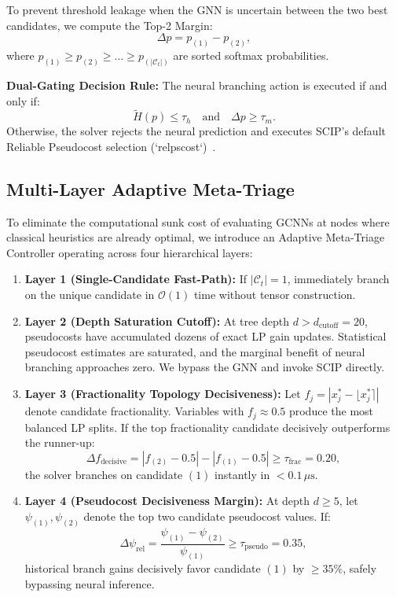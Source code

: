 \documentclass[10pt,twocolumn,letterpaper]{article}
\theoremstyle{plain}
\theoremstyle{definition}
\theoremstyle{remark}
\begin{document}
To prevent threshold leakage when the GNN is uncertain between the two best candidates, we compute the Top-2 Margin:
\begin{equation}
    \Delta p = p_{(1)} - p_{(2)}, \label{eq:margin}
\end{equation}
where $p_{(1)} \ge p_{(2)} \ge \dots \ge p_{(|\mathcal{C}_t|)}$ are sorted softmax probabilities.

\textbf{Dual-Gating Decision Rule:} The neural branching action is executed if and only if:
\begin{equation}
    \tilde{H}(p) \le \tau_h \quad \text{and} \quad \Delta p \ge \tau_m. \label{eq:dual_gate}
\end{equation}
Otherwise, the solver rejects the neural prediction and executes SCIP's default Reliable Pseudocost selection (`relpscost`)~\cite{achterberg2005branching}.

\subsection{Multi-Layer Adaptive Meta-Triage}
To eliminate the computational sunk cost of evaluating GCNNs at nodes where classical heuristics are already optimal, we introduce an Adaptive Meta-Triage Controller operating across four hierarchical layers:

\begin{enumerate}
    \item \textbf{Layer 1 (Single-Candidate Fast-Path):} If $|\mathcal{C}_t| = 1$, immediately branch on the unique candidate in $\mathcal{O}(1)$ time without tensor construction.
    \item \textbf{Layer 2 (Depth Saturation Cutoff):} At tree depth $d > d_{\text{cutoff}} = 20$, pseudocosts have accumulated dozens of exact LP gain updates. Statistical pseudocost estimates are saturated, and the marginal benefit of neural branching approaches zero. We bypass the GNN and invoke SCIP directly.
    \item \textbf{Layer 3 (Fractionality Topology Decisiveness):} Let $f_j = |x_j^* - \lfloor x_j^* \rceil|$ denote candidate fractionality. Variables with $f_j \approx 0.5$ produce the most balanced LP splits. If the top fractionality candidate decisively outperforms the runner-up:
    \begin{equation}
        \Delta f_{\text{decisive}} = |f_{(2)} - 0.5| - |f_{(1)} - 0.5| \ge \tau_{\text{frac}} = 0.20,
    \end{equation}
    the solver branches on candidate $(1)$ instantly in $<0.1\,\mu\text{s}$.
    \item \textbf{Layer 4 (Pseudocost Decisiveness Margin):} At depth $d \ge 5$, let $\psi_{(1)}, \psi_{(2)}$ denote the top two candidate pseudocost values. If:
    \begin{equation}
        \Delta \psi_{\text{rel}} = \frac{\psi_{(1)} - \psi_{(2)}}{\psi_{(1)}} \ge \tau_{\text{pseudo}} = 0.35,
    \end{equation}
    historical branch gains decisively favor candidate $(1)$ by $\ge 35\%$, safely bypassing neural inference.
\end{enumerate}
\end{document}
